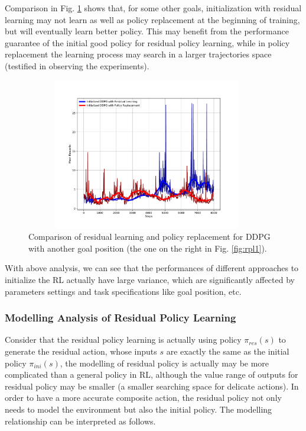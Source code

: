 \documentclass{article}
\begin{document}
Comparison in Fig. \ref{fig:rpl3} shows that, for some other goals, initialization with residual learning may not learn as well as policy replacement at the beginning of training, but will eventually learn better policy. This may benefit from the performance guarantee of the initial good policy for residual policy learning, while in policy replacement the learning process may search in a larger trajectories space (testified in observing the experiments). 
\begin{figure}[htbp]
	\centering
	\includegraphics[height=250, width=400]{img/res_ddpg2.pdf}
	\caption{Comparison of residual learning and policy replacement for DDPG with another goal position (the one on the right in Fig. \ref{fig:rpl1}).}
	\label{fig:rpl3}
\end{figure}

With above analysis, we can see that the performances of different approaches to initialize the RL actually have large variance, which are significantly affected by parameters settings and task specifications like goal position, etc. 

\subsubsection{Modelling Analysis of Residual Policy Learning}
Consider that the residual policy learning is actually using policy $\pi_{res}(s)$ to generate the residual action, whose inputs $s$ are exactly the same as the initial policy $\pi_{ini}(s)$, the modelling of residual policy is actually may be more complicated than a general policy in RL, although the value range of outputs for residual policy may be smaller (a smaller searching space for delicate actions). In order to have a more accurate composite action, the residual policy not only needs to model the environment but also the initial policy. The modelling relationship can be interpreted as follows. 
\end{document}
